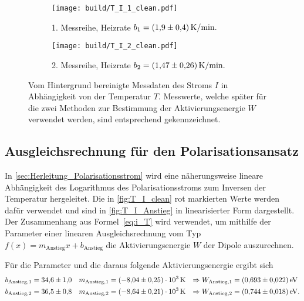 \begin{figure}
    \centering
    \begin{subfigure}{\textwidth}
        \centering
        \texttt{[image: build/T\_I\_1\_clean.pdf]}
        \caption{1. Messreihe, Heizrate $b_1 = \qty{1.9+-0.4}{\kelvin\per\minute}.$}
        \label{fig:T_I_1_clean}
    \end{subfigure}
    \begin{subfigure}{\textwidth}
        \centering
        \texttt{[image: build/T\_I\_2\_clean.pdf]}
        \caption{2. Messreihe, Heizrate $b_2 = \qty{1.47+-0.26}{\kelvin\per\minute}.$}
        \label{fig:T_I_2_clean}
    \end{subfigure}
    \caption{Vom Hintergrund bereinigte Messdaten des Stroms $I$ in Abhängigkeit von der Temperatur $T$. Messwerte, welche später für die zwei Methoden zur Bestimmung %
    der Aktivierungsenergie $W$ verwendet werden, sind entsprechend gekennzeichnet.}
    \label{fig:T_I_clean}
\end{figure}

\subsection{Ausgleichsrechnung für den Polarisationsansatz}
\label{sec:Ausgleichsrechnung_Polarisationsansatz}
In \autoref{sec:Herleitung_Polarisationsstrom} wird eine näherungsweise lineare Abhängigkeit des Logarithmus des Polarisationsstroms zum Inversen der Temperatur hergeleitet.
Die in \autoref{fig:T_I_clean} rot markierten Werte werden dafür verwendet und sind in \autoref{fig:T_I_Anstieg} in linearisierter Form dargestellt.
Der Zusammenhang aus Formel~\eqref{eq:i_T} wird verwendet, um mithilfe der Parameter einer linearen Ausgleichsrechnung vom Typ $f(x) = m_{\text{Anstieg}}x+b_{\text{Anstieg}}$ die
Aktivierungsenergie $W$ der Dipole auszurechnen.

Für die Parameter und die daraus folgende Aktivierungsenergie ergibt sich
\begin{align*}
    b_{\text{Anstieg}, 1} &= \num{34.6+-1.0} & m_{\text{Anstieg}, 1} &= \qty{-8.04(0.25)e+03}{\kelvin} &\Rightarrow W_{\text{Anstieg}, 1} &= \qty{0.693+-0.022}{\electronvolt} \\
    b_{\text{Anstieg}, 2} &= \num{36.5+-0.8} & m_{\text{Anstieg}, 2} &= \qty{-8.64(0.21)e+03}{\kelvin} &\Rightarrow W_{\text{Anstieg}, 2} &= \qty{0.744+-0.018}{\electronvolt}. \\
\end{align*}


